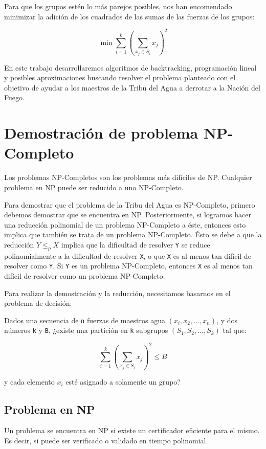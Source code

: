 \documentclass{article}
\begin{document}
Para que los grupos estén lo más parejos posibles, nos han encomendado minimizar la adición de los cuadrados de las sumas de las fuerzas de los grupos:

$$
\min \sum_{i=1}^{k} \left( \sum_{x_j \in S_i} x_j \right)^2
$$

En este trabajo desarrollaremos algoritmos de backtracking, programación lineal y posibles aproximaciones buscando resolver el problema planteado con el objetivo de ayudar a los maestros de la Tribu del Agua a derrotar a la Nación del Fuego.

\section{Demostración de problema NP-Completo}
\label{sec:np-completo}

Los problemas NP-Completos son los problemas más difíciles de NP. Cualquier problema en NP puede ser reducido a uno NP-Completo.

Para demostrar que el problema de la Tribu del Agua es NP-Completo, primero debemos demostrar que se encuentra en NP. Posteriormente, si logramos hacer una reducción polinomial de un problema NP-Completo a éste, entonces esto implica que también se trata de un problema NP-Completo. Ésto se debe a que la reducción $Y \leq_p X$ implica que la dificultad de resolver \texttt{Y} se reduce polinomialmente a la dificultad de resolver \texttt{X}, o que \texttt{X} es al menos tan difícil de resolver como \texttt{Y}. Si \texttt{Y} es un problema NP-Completo, entonces \texttt{X} es al menos tan difícil de resolver como un problema NP-Completo.

Para realizar la demostración y la reducción, necesitamos basarnos en el problema de decisión:

Dados una secuencia de \texttt{n} fuerzas de maestros agua $(x_i, x_2, \dots, x_n)$, y dos números \texttt{k} y \texttt{B}, ¿existe una partición en \texttt{k} subgrupos $(S_1, S_2, \dots, S_k)$ tal que:

$$
\sum_{i=1}^{k} \left( \sum_{x_j \in S_i} x_j \right)^2 \leq B
$$

y cada elemento $x_i$ esté asignado a solamente un grupo?
\subsection{Problema en NP}
\label{sec:taEnNp}

Un problema se encuentra en NP si existe un certificador eficiente para el mismo. Es decir, si puede ser verificado o validado en tiempo polinomial. 
\end{document}
